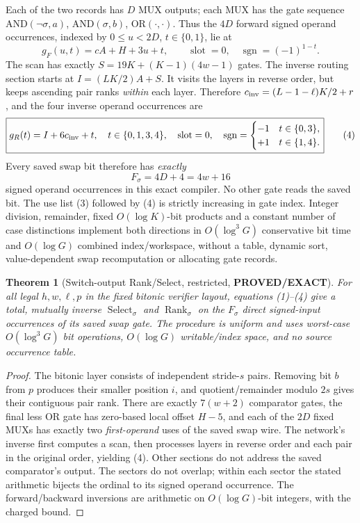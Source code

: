 \documentclass[11pt]{article}
\newtheorem{theorem}{Theorem}
\begin{document}
Each of the two records has $D$ MUX outputs; each MUX has the gate
sequence $\mathrm{AND}(\neg\sigma,a)$,
$\mathrm{AND}(\sigma,b)$, $\mathrm{OR}(\cdot,\cdot)$.
Thus the $4D$ forward signed operand occurrences, indexed by
$0\le u<2D$, $t\in\{0,1\}$, lie at
\[
\boxed{g_F(u,t)=cA+H+3u+t,\qquad
 \operatorname{slot}=0,\quad
 \operatorname{sgn}=(-1)^{1-t}.}                         \tag{3}
\]
The scan has exactly $S=19K+(K-1)(4w-1)$ gates.
The inverse routing section starts at
$I=(LK/2)A+S$. It visits the layers in reverse
order, but keeps ascending pair ranks \emph{within} each layer.
Therefore $c_{\rm inv}=(L-1-\ell)K/2+r$, and the
four inverse operand occurrences are
\[
\boxed{g_R(t)=I+6c_{\rm inv}+t,\quad
t\in\{0,1,3,4\},\quad
\operatorname{slot}=0,\quad
\operatorname{sgn}=
\begin{cases}-1&t\in\{0,3\},\\+1&t\in\{1,4\}.\end{cases}}
                                                               \tag{4}
\]
Every saved swap bit therefore has \emph{exactly}
\[
\boxed{F_\sigma=4D+4=4w+16}                              \tag{5}
\]
signed operand occurrences in this exact compiler. No other gate
reads the saved bit. The use list (3) followed by (4) is strictly
increasing in gate index. Integer division, remainder, fixed
$O(\log K)$-bit products and a constant number of case distinctions
implement both directions in $O(\log^3G)$ conservative bit time
and $O(\log G)$ combined index/workspace, without a table, dynamic
sort, value-dependent swap recomputation or allocating gate records.

\begin{theorem}[Switch-output Rank/Select, restricted,
\textbf{PROVED/EXACT}]\label{th:switch}
For all legal $h,w,\ell,p$ in the fixed bitonic verifier layout,
equations (1)--(4) give a total, mutually inverse
$\operatorname{Select}_{\sigma}$ and
$\operatorname{Rank}_{\sigma}$ on the $F_\sigma$ direct
signed-input occurrences of its saved swap gate. The procedure is
uniform and uses worst-case $O(\log^3G)$ bit operations,
$O(\log G)$ writable/index space, and no source occurrence table.
\end{theorem}
\begin{proof}
The bitonic layer consists of independent stride-$s$ pairs.
Removing bit $b$ from $p$ produces their smaller position $i$,
and quotient/remainder modulo $2s$ gives their contiguous pair rank.
There are exactly $7(w+2)$ comparator gates, the final less
OR gate has zero-based local offset $H-5$, and each of the
$2D$ fixed MUXs has exactly two \emph{first-operand} uses
of the saved swap wire. The network's inverse first computes a
scan, then processes layers in reverse order and each pair in the
original order, yielding (4). Other sections do not address the
saved comparator's output. The sectors do not overlap;
within each sector the stated arithmetic bijects the ordinal to
its signed operand occurrence. The forward/backward inversions
are arithmetic on $O(\log G)$-bit integers, with the charged bound.
\end{proof}
\end{document}
